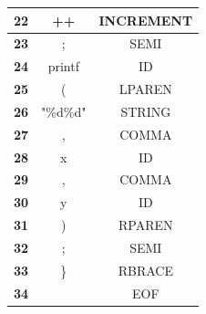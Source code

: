 \documentclass{article}
\begin{document}
\begin{latin}
\begin{longtable}[c]{|c|c|c|}
\textbf{22} & ++                        & INCREMENT     \\ \hline
\textbf{23} & ;                         & SEMI          \\ \hline
\textbf{24} & printf                    & ID            \\ \hline
\textbf{25} & (                         & LPAREN        \\ \hline
\textbf{26} & "\%d\%\:d" & STRING        \\ \hline
\textbf{27} & ,                         & COMMA         \\ \hline
\textbf{28} & x                         & ID            \\ \hline
\textbf{29} & ,                         & COMMA         \\ \hline
\textbf{30} & y                         & ID            \\ \hline
\textbf{31} & )                         & RPAREN        \\ \hline
\textbf{32} & ;                         & SEMI          \\ \hline
\textbf{33} & \}   & RBRACE        \\ \hline
\textbf{34} &                           & EOF           \\ \hline
\end{longtable}
\end{latin}
\end{document}
